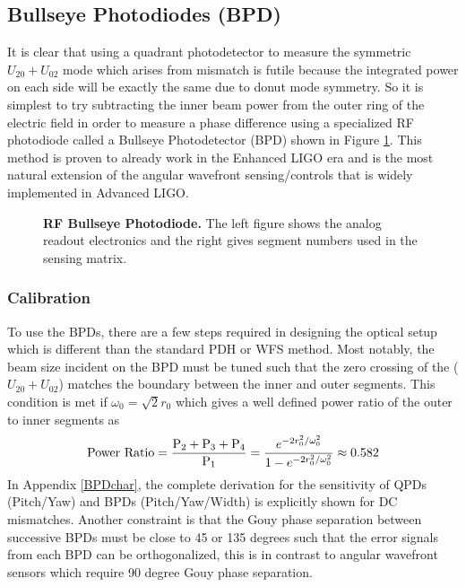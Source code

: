 	\subsection{Bullseye Photodiodes (BPD)}
	It is clear that using a quadrant photodetector to measure the symmetric $U_{20} + U_{02}$ mode which arises from mismatch is futile because the integrated power on each side will be exactly the same due to donut mode symmetry. So it is simplest to try subtracting the inner beam power from the outer ring of the electric field in order to measure a phase difference using a specialized RF photodiode called a Bullseye Photodetector (BPD) shown in Figure \ref{fig:BPD}.  This method is proven to already work in the Enhanced LIGO era \cite{MuellerMM} and is the most natural extension of the angular wavefront sensing/controls that is widely implemented in Advanced LIGO.
	
	\begin{figure}[h]
		\centering
		\caption[RF Bullseye Photodiode.]
		{\textbf{RF Bullseye Photodiode.}  The left figure shows the analog readout electronics and the right gives segment numbers used  in the sensing matrix.
		}
		\label{fig:BPD}
	\end{figure}
	
	\subsubsection{Calibration}
		To use the BPDs, there are a few steps required in designing the optical setup which is different than the standard PDH or WFS method.  Most notably, the beam size incident on the BPD must be tuned such that the zero crossing of the ($U_{20} + U_{02}$) matches the boundary between the inner and outer segments.  This condition is met if $\omega_{0} = \sqrt{2} r_0$ which gives a well defined power ratio of the outer to inner segments as 
		\begin{equation}
		\text{Power Ratio} = \frac{\text{P}_2 + \text{P}_3 + \text{P}_4}{\text{P}_1}  \\
		= \frac{e^{-2r_0^2/ \omega_{0}^2}} {1 - e^{-2r_0^2/ \omega_{0}^2 }} \approx 0.582
		\end{equation}
		In Appendix \ref{BPDchar}, the complete derivation for the sensitivity of QPDs (Pitch/Yaw) and BPDs (Pitch/Yaw/Width) is explicitly shown for DC mismatches.  Another constraint is that the Gouy phase separation between successive BPDs must be close to 45 or 135 degrees such that the error signals from each BPD can be orthogonalized, this is in contrast to angular wavefront sensors which require 90 degree Gouy phase separation.  
		
